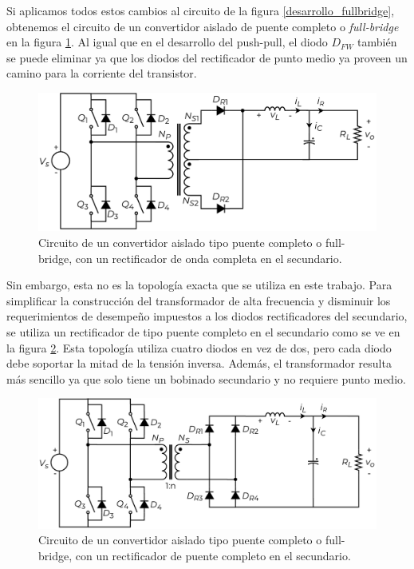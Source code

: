 Si aplicamos todos estos cambios al circuito de la figura \ref{desarrollo_fullbridge}, obtenemos el circuito de un {\Medium convertidor aislado de puente completo} o {\Medium \textit{full-bridge}} en la figura \ref{fullbridge_partido}. Al igual que en el desarrollo del push-pull, el diodo $D_{FW}$ también se puede eliminar ya que los diodos del rectificador de punto medio ya proveen un camino para la corriente del transistor.\\

\begin{figure}[H]
    \centering
    \includegraphics[scale=0.6]{Imagenes/Full Bridge Onda Completa.pdf}
    \caption{Circuito de un convertidor aislado tipo puente completo o full-bridge, con un rectificador de onda completa en el secundario.}
    \label{fullbridge_partido}
\end{figure}

Sin embargo, esta no es la topología exacta que se utiliza en este trabajo. Para simplificar la construcción del transformador de alta frecuencia y disminuir los requerimientos de desempeño impuestos a los diodos rectificadores del secundario, se utiliza un {\Medium rectificador de tipo puente completo} en el secundario como se ve en la figura \ref{fullbridge}. Esta topología utiliza cuatro diodos en vez de dos, pero cada diodo debe soportar la mitad de la tensión inversa. Además, el transformador resulta más sencillo ya que solo tiene un bobinado secundario y no requiere punto medio.\\

\begin{figure}[h]
    \centering
    \includegraphics[scale=0.6]{Imagenes/Full Bridge.pdf}
    \caption{Circuito de un convertidor aislado tipo puente completo o full-bridge, con un rectificador de puente completo en el secundario.}
    \label{fullbridge}
\end{figure}
    
